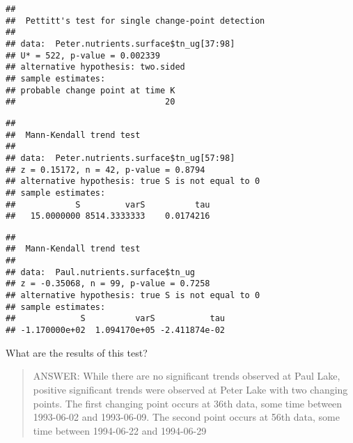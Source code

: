 \documentclass[]{article}
\newenvironment{Shaded}{\begin{snugshade}}{\end{snugshade}}
\newcommand{\KeywordTok}[1]{\textcolor[rgb]{0.13,0.29,0.53}{\textbf{#1}}}
\newcommand{\DecValTok}[1]{\textcolor[rgb]{0.00,0.00,0.81}{#1}}
\newcommand{\CommentTok}[1]{\textcolor[rgb]{0.56,0.35,0.01}{\textit{#1}}}
\newcommand{\OperatorTok}[1]{\textcolor[rgb]{0.81,0.36,0.00}{\textbf{#1}}}
\newcommand{\NormalTok}[1]{#1}
\begin{document}
\begin{verbatim}
## 
##  Pettitt's test for single change-point detection
## 
## data:  Peter.nutrients.surface$tn_ug[37:98]
## U* = 522, p-value = 0.002339
## alternative hypothesis: two.sided
## sample estimates:
## probable change point at time K 
##                              20
\end{verbatim}

\begin{Shaded}
\end{Shaded}

\begin{verbatim}
## 
##  Mann-Kendall trend test
## 
## data:  Peter.nutrients.surface$tn_ug[57:98]
## z = 0.15172, n = 42, p-value = 0.8794
## alternative hypothesis: true S is not equal to 0
## sample estimates:
##            S         varS          tau 
##   15.0000000 8514.3333333    0.0174216
\end{verbatim}

\begin{Shaded}
\end{Shaded}

\begin{verbatim}
## 
##  Mann-Kendall trend test
## 
## data:  Paul.nutrients.surface$tn_ug
## z = -0.35068, n = 99, p-value = 0.7258
## alternative hypothesis: true S is not equal to 0
## sample estimates:
##             S          varS           tau 
## -1.170000e+02  1.094170e+05 -2.411874e-02
\end{verbatim}

What are the results of this test?

\begin{quote}
ANSWER: While there are no significant trends observed at Paul Lake,
positive significant trends were observed at Peter Lake with two
changing points. The first changing point occurs at 36th data, some time
between 1993-06-02 and 1993-06-09. The second point occurs at 56th data,
some time between 1994-06-22 and 1994-06-29
\end{quote}
\end{document}
